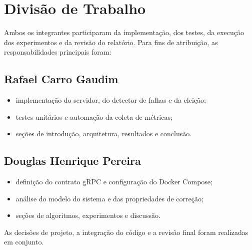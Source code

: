 \section{Divisão de Trabalho}
\label{sec:divisao}

Ambos os integrantes participaram da implementação, dos testes, da execução
dos experimentos e da revisão do relatório. Para fins de atribuição, as
responsabilidades principais foram:

\subsection{Rafael Carro Gaudim}
\begin{itemize}
    \item implementação do servidor, do detector de falhas e da eleição;
    \item testes unitários e automação da coleta de métricas;
    \item seções de introdução, arquitetura, resultados e conclusão.
\end{itemize}

\subsection{Douglas Henrique Pereira}
\begin{itemize}
    \item definição do contrato gRPC e configuração do Docker Compose;
    \item análise do modelo do sistema e das propriedades de correção;
    \item seções de algoritmos, experimentos e discussão.
\end{itemize}

\noindent As decisões de projeto, a integração do código e a revisão final
foram realizadas em conjunto.
